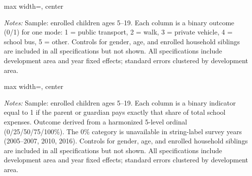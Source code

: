\documentclass[12pt]{article}
\newcommand*{\TableLagOnePath}{../Paper_3_Tables/Lagged_1Year_Tables}
\begin{document}
	\begin{table}[H]
	\centering
	\begin{adjustbox}{max width=\linewidth, center}
	\begin{threeparttable}
		\caption{Mode of Transport to School, IV Estimates}
		\label{tab:transport}
		{\small}
		\begin{tablenotes}
			\small
			\item \textit{Notes:} Sample: enrolled children ages 5--19. Each column is a binary outcome (0/1) for one mode: 1 = public transport, 2 = walk, 3 = private vehicle, 4 = school bus, 5 = other. Controls for gender, age, and enrolled household siblings are included in all specifications but not shown. All specifications include development area and year fixed effects; standard errors clustered by development area.
		\end{tablenotes}
	\end{threeparttable}
	\end{adjustbox}
	\end{table}

	\begin{table}[H]
	\centering
	\begin{adjustbox}{max width=\linewidth, center}
	\begin{threeparttable}
		\caption{Parental Share of School Expenses, IV Estimates}
		\label{tab:expshare_parent}
		{\small}
		\begin{tablenotes}
			\small
			\item \textit{Notes:} Sample: enrolled children ages 5--19. Each column is a binary indicator equal to 1 if the parent or guardian pays exactly that share of total school expenses. Outcome derived from a harmonized 5-level ordinal (0/25/50/75/100\%). The 0\% category is unavailable in string-label survey years (2005--2007, 2010, 2016). Controls for gender, age, and enrolled household siblings are included in all specifications but not shown. All specifications include development area and year fixed effects; standard errors clustered by development area.
		\end{tablenotes}
	\end{threeparttable}
	\end{adjustbox}
	\end{table}
\end{document}
